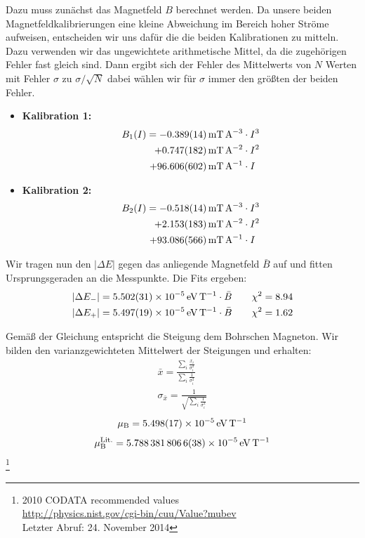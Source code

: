 \documentclass[11pt, a4paper]{article}
\begin{document}
Dazu muss zunächst das Magnetfeld $B$ berechnet werden.
Da unsere beiden Magnetfeldkalibrierungen eine kleine Abweichung im Bereich hoher Ströme aufweisen, entscheiden wir uns dafür die die beiden Kalibrationen zu mitteln.
Dazu verwenden wir das ungewichtete arithmetische Mittel, da die zugehörigen Fehler fast gleich sind.
Dann ergibt sich der Fehler des Mittelwerts von $N$ Werten mit Fehler $\sigma$ zu $\sigma/\sqrt{N}$ dabei wählen wir für $\sigma$ immer den größten der beiden Fehler.

\begin{itemize}
	\item \textbf{Kalibration 1:}
	\begin{align}
	B_1(I) = \SI{-0.389 +- 0.014}{\milli\tesla\per\ampere\cubed} &\cdot I^3 \nonumber\\
	       +\SI{0.747+-0.182}{\milli\tesla\per\ampere\squared} &\cdot I^2 \nonumber\\
	       + \SI{96.606 +- 0.602}{\milli\tesla\per\ampere} &\cdot I
	\end{align}
	\item \textbf{Kalibration 2:}
	\begin{align}
	B_2(I) = \SI{-0.518 +- 0.014}{\milli\tesla\per\ampere\cubed} &\cdot I^3 \nonumber\\
	+\SI{2.153+-0.183}{\milli\tesla\per\ampere\squared} &\cdot I^2 \nonumber\\
	+ \SI{93.086 +- 0.566}{\milli\tesla\per\ampere} &\cdot I
	\end{align}
\end{itemize}

Wir tragen nun den $|\Delta E|$ gegen das anliegende Magnetfeld $\bar{B}$ auf und fitten Ursprungsgeraden an die Messpunkte.
Die Fits ergeben:
\begin{align}
	|\Delta E_{-}| = \SI{5.502 +- 0.031e-5}{\electronvolt\per\tesla} \cdot \bar{B} \qquad \chi^2 = 8.94\\
	|\Delta E_{+}| = \SI{5.497 +- 0.019e-5}{\electronvolt\per\tesla} \cdot \bar{B} \qquad \chi^2 = 1.62
\end{align}

Gemäß der Gleichung entspricht die Steigung dem Bohrschen Magneton. Wir bilden den varianzgewichteten Mittelwert der Steigungen und erhalten:
\begin{align}
	\bar{x} = \frac{\sum_i \frac{x_i}{\sigma_i^2}}{\sum_i \frac{1}{\sigma_i^2}} \\
	\sigma_{\bar{x}} = \frac{1}{\sqrt{\sum_i \frac{1}{\sigma_i^2}}}
\end{align}
\begin{align}
	\mu_\mathrm{B} = \SI{5.498 +- 0.017e-5}{\electronvolt\per\tesla}
\end{align}
\begin{align}
	\mu_\mathrm{B}^{\mathrm{Lit.}} = \SI{5.7883818066 +- 0.0000000038e-5}{\electronvolt\per\tesla}
\end{align}
\footnote{2010 CODATA recommended values\\ \url{http://physics.nist.gov/cgi-bin/cuu/Value?mubev}\\ Letzter Abruf: 24. November 2014}
\end{document}
